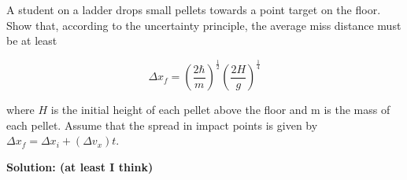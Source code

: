 \documentclass[11pt]{article}
\begin{document}
A student on a ladder drops small pellets towards a point target on the floor. Show that, according to the uncertainty principle, the average miss distance must be at least

$$\Delta x_f = \left(\frac{2\hbar}{m} \right)^\frac{1}{2} \left(\frac{2H}{g} \right)^\frac{1}{4}$$

where $H$ is the initial height of each pellet above the floor and m is the mass of each pellet. Assume that the spread in impact points is given by $\Delta x_f = \Delta x_i + (\Delta v_x) t$.

\begin{tcolorbox}
\textbf{Solution: (at least I think)}



\end{tcolorbox}
\end{document}
